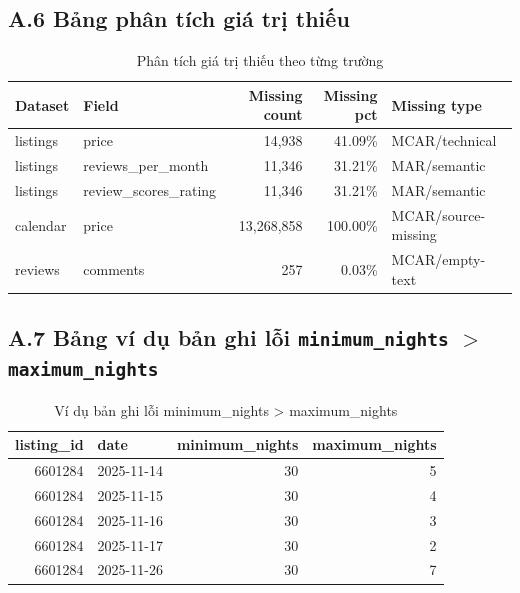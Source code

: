 \subsection*{A.6 Bảng phân tích giá trị thiếu}

\begin{table}[H]
\centering
\caption{Phân tích giá trị thiếu theo từng trường}\label{tab:A6}
\begin{tabular}{|l|l|r|r|l|}
\hline
\textbf{Dataset} & \textbf{Field} & \textbf{Missing count} & \textbf{Missing pct} & \textbf{Missing type} \\
\hline
listings & price                  & 14,938     & 41.09\%  & MCAR/technical \\ \hline

listings & reviews\_per\_month    & 11,346     & 31.21\%  & MAR/semantic \\ \hline

listings & review\_scores\_rating & 11,346     & 31.21\%  & MAR/semantic \\ \hline

calendar & price                  & 13,268,858 & 100.00\% & MCAR/source-missing \\ \hline

reviews  & comments               & 257        & 0.03\%   & MCAR/empty-text \\
\hline
\end{tabular}
\end{table}

\subsection*{A.7 Bảng ví dụ bản ghi lỗi \texttt{minimum\_nights} $>$ \texttt{maximum\_nights}}

\begin{table}[H]
\centering
\caption{Ví dụ bản ghi lỗi minimum\_nights > maximum\_nights}\label{tab:A7}
\begin{tabular}{|r|l|r|r|}
\hline
\textbf{listing\_id} & \textbf{date} & \textbf{minimum\_nights} & \textbf{maximum\_nights} \\
\hline
6601284 & 2025-11-14 & 30 & 5 \\ \hline

6601284 & 2025-11-15 & 30 & 4 \\ \hline

6601284 & 2025-11-16 & 30 & 3 \\ \hline

6601284 & 2025-11-17 & 30 & 2 \\ \hline

6601284 & 2025-11-26 & 30 & 7 \\
\hline
\end{tabular}
\end{table}

